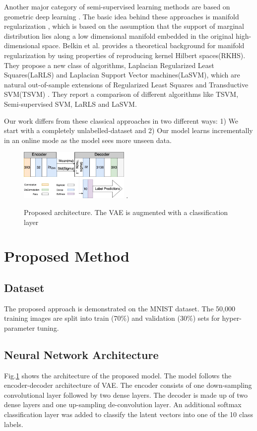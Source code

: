 \documentclass[runningheads]{llncs}
\begin{document}
Another major category of semi-supervised learning methods are based on geometric deep learning \cite{mikhail_2006,ding_2018,li_2018}.
The basic idea behind these approaches is manifold regularization \cite{mikhail_2006,ding_2018}, which is based on the assumption that the support of marginal distribution lies along a low dimensional manifold embedded in the original high-dimensional space.
Belkin et al. \cite{mikhail_2006} provides a theoretical background for manifold regularization by using properties of reproducing kernel Hilbert spaces(RKHS).
They propose a new class of algorithms, Laplacian Regularized Least Squares(LaRLS) and Laplacian Support Vector machines(LaSVM), which are natural out-of-sample extensions of Regularized Least Squares and Transductive SVM(TSVM) \cite{joachims_1999}.
They report a comparison of different algorithms like TSVM, Semi-supervised SVM\cite{bennett_1999}, LaRLS and LaSVM.

Our work differs from these classical approaches in two different ways: 1) We start with a completely unlabelled-dataset and 2) Our model learns incrementally in an online mode as the model sees more unseen data.

\begin{figure}[!t]
\centering
\includegraphics[width=2.1in]{images/var_arch_v5.jpg}
\DeclareGraphicsExtensions.
\caption{Proposed architecture. The VAE is augmented with a classification layer}
\label{vae_architecture}
\end{figure}
\section{Proposed Method}

\subsection{Dataset}
The proposed approach is demonstrated on the MNIST dataset.
The 50,000 training images are split into train (70\%) and validation (30\%) sets for hyper-parameter tuning.

\subsection{Neural Network Architecture}
Fig.\ref{vae_architecture} shows the architecture of the proposed model.
The model follows the encoder-decoder architecture of VAE.
The encoder consists of one down-sampling convolutional layer followed by two dense layers.
The decoder is made up of two dense layers and one up-sampling de-convolution layer.
An additional softmax classification layer was added to classify the latent vectors into one of the 10 class labels.
\end{document}
